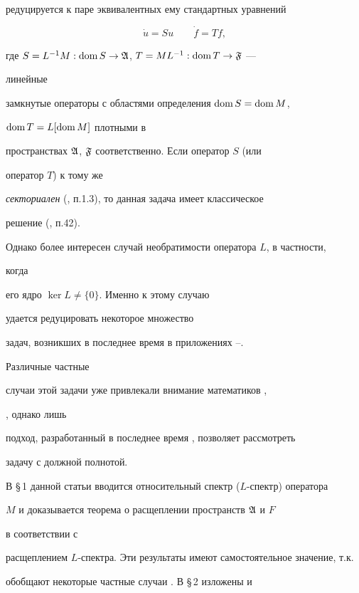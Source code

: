 редуцируется к паре эквивалентных ему стандартных уравнений 


\begin{equation*} 


\Dot u=Su\qquad \Dot f=Tf, 


\end{equation*} 


где $S=L^{-1}M:\operatorname{dom} S\to \frak A$, $T=ML^{-1}:\operatorname{dom} T\to \frak F$ --- 


линейные 


замкнутые операторы с областями определения $\operatorname{dom} S=\operatorname{dom} M$, 


$\operatorname{dom} T=L[\operatorname{dom} M]$ плотными в 


пространствах $\frak A$, $\frak F$ соответственно. Если оператор $S$ (или 


оператор $T$) к тому же 


{\it секториален} (\cite{Hen}, п.1.3), то данная задача имеет классическое 


решение (\cite{Mas}, п.42). 


 


Однако более интересен случай необратимости оператора $L$, в частности, 


когда 


его ядро $\ker L\ne \{0\}$. Именно к этому случаю 


удается редуцировать некоторое множество 


задач, возникших в последнее время в приложениях \cite{Sv2}--\cite{Sv4}. 


Различные частные 


случаи этой задачи уже привлекали внимание математиков \cite{Sob}, 


\cite{Pov}, однако лишь 


подход, разработанный в последнее время \cite{Sv5}, позволяет рассмотреть 


задачу с должной полнотой. 


 


В \S\,1 данной статьи вводится относительный спектр ($L$-спектр) оператора 


$M$ и доказывается теорема о расщеплении пространств $\frak A$ и $F$ 


в соответствии с 


расщеплением $L$-спектра. Эти результаты имеют самостоятельное значение, т.к. 


обобщают некоторые частные случаи \cite{Sv5}. В \S\,2 изложены и 


